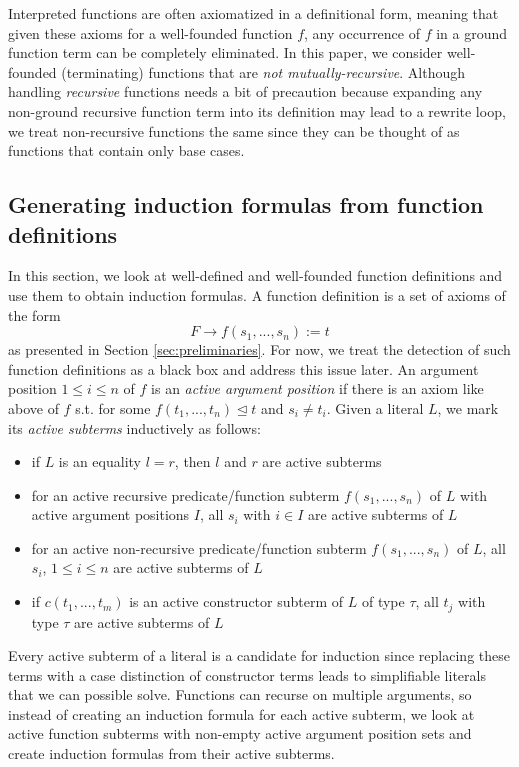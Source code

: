 
Interpreted functions are often axiomatized in a definitional form, meaning that given these axioms for a well-founded function $f$, any occurrence of $f$ in a ground function term can be completely eliminated. In this paper, we consider well-founded (terminating) functions that are \textit{not mutually-recursive}. Although handling \textit{recursive} functions needs a bit of precaution because expanding any non-ground recursive function term into its definition may lead to a rewrite loop, we treat non-recursive functions the same since they can be thought of as functions that contain only base cases.
\subsection{Generating induction formulas from function definitions}\label{sec:generating}
In this section, we look at well-defined and well-founded function definitions and use them to obtain induction formulas. A function definition is a set of axioms of the form
$$F\rightarrow f(s_1,...,s_n):=t$$
as presented in Section \ref{sec:preliminaries}. For now, we treat the detection of such function definitions as a black box and address this issue later. An argument position $1\le i\le n$ of $f$ is an \textit{active argument position} if there is an axiom like above of $f$ s.t. for some $f(t_1,...,t_n)\trianglelefteq t$ and $s_i\neq t_i$. Given a literal $L$, we mark its \textit{active subterms} inductively as follows:
\begin{itemize}
	\item if $L$ is an equality $l=r$, then $l$ and $r$ are active subterms
	\item for an active recursive predicate/function subterm $f(s_1,...,s_n)$ of $L$ with active argument positions $I$, all $s_i$ with $i\in I$ are active subterms of $L$
	\item for an active non-recursive predicate/function subterm $f(s_1,...,s_n)$ of $L$, all $s_i$, $1\le i\le n$ are active subterms of $L$
	\item if $c(t_1,...,t_m)$ is an active constructor subterm of $L$ of type $\tau$, all $t_j$ with type $\tau$ are active subterms of $L$
\end{itemize}

Every active subterm of a literal is a candidate for induction since replacing these terms with a case distinction of constructor terms leads to simplifiable literals that we can possible solve. Functions can recurse on multiple arguments, so instead of creating an induction formula for each active subterm, we look at active function subterms with non-empty active argument position sets and create induction formulas from their active subterms.

